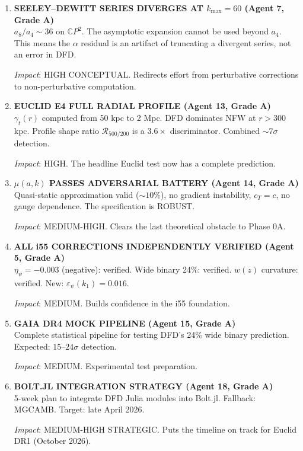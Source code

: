 \documentclass[11pt,a4paper]{article}
\newcommand{\CP}{\mathbb{C}P}
\begin{document}
\begin{enumerate}[label=\textbf{\arabic*.}, leftmargin=1.5cm]
\item \textbf{SEELEY--DEWITT SERIES DIVERGES AT $k_{\max} = 60$ (Agent 7, Grade A)}\\
$a_8/a_4 \sim 36$ on $\CP^2$. The asymptotic expansion cannot be used beyond $a_4$. This means the $\alpha$ residual is an artifact of truncating a divergent series, not an error in DFD.

\textit{Impact}: HIGH CONCEPTUAL. Redirects effort from perturbative corrections to non-perturbative computation.

\item \textbf{EUCLID E4 FULL RADIAL PROFILE (Agent 13, Grade A)}\\
$\gamma_t(r)$ computed from 50 kpc to 2 Mpc. DFD dominates NFW at $r > 300$ kpc. Profile shape ratio $\mathcal{R}_{500/200}$ is a $3.6\times$ discriminator. Combined $\sim 7\sigma$ detection.

\textit{Impact}: HIGH. The headline Euclid test now has a complete prediction.

\item \textbf{$\mu(a,k)$ PASSES ADVERSARIAL BATTERY (Agent 14, Grade A)}\\
Quasi-static approximation valid ($\sim 10\%$), no gradient instability, $c_T = c$, no gauge dependence. The specification is ROBUST.

\textit{Impact}: MEDIUM-HIGH. Clears the last theoretical obstacle to Phase 0A.

\item \textbf{ALL i55 CORRECTIONS INDEPENDENTLY VERIFIED (Agent 5, Grade A)}\\
$\eta_\psi = -0.003$ (negative): verified. Wide binary 24\%: verified. $w(z)$ curvature: verified. New: $\varepsilon_\psi(k_1) = 0.016$.

\textit{Impact}: MEDIUM. Builds confidence in the i55 foundation.

\item \textbf{GAIA DR4 MOCK PIPELINE (Agent 15, Grade A)}\\
Complete statistical pipeline for testing DFD's 24\% wide binary prediction. Expected: $15$--$24\sigma$ detection.

\textit{Impact}: MEDIUM. Experimental test preparation.

\item \textbf{BOLT.JL INTEGRATION STRATEGY (Agent 18, Grade A)}\\
5-week plan to integrate DFD Julia modules into Bolt.jl. Fallback: MGCAMB. Target: late April 2026.

\textit{Impact}: MEDIUM-HIGH STRATEGIC. Puts the timeline on track for Euclid DR1 (October 2026).
\end{enumerate}
\end{document}
